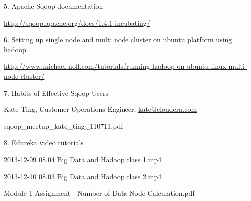 \documentclass[a4paper,12pt,oneside]{sphinxmanual}
\begin{document}
\begin{DUlineblock}{0em}
\item[] 5. Apache Sqoop documentation
\item[]
\begin{DUlineblock}{\DUlineblockindent}
\item[] \href{http://sqoop.apache.org/docs/1.4.1-incubating/}{http://sqoop.apache.org/docs/1.4.1-incubating/}
\end{DUlineblock}
\end{DUlineblock}

\begin{DUlineblock}{0em}
\item[] 6. Setting up single node and multi node cluster on ubuntu platform using hadoop
\item[]
\begin{DUlineblock}{\DUlineblockindent}
\item[] \href{http://www.michael-noll.com/tutorials/running-hadoop-on-ubuntu-linux-multi-node-cluster/}{http://www.michael-noll.com/tutorials/running-hadoop-on-ubuntu-linux-multi-node-cluster/}
\end{DUlineblock}
\end{DUlineblock}

\begin{DUlineblock}{0em}
\item[] 7. Habits of Effective Sqoop Users
\item[]
\begin{DUlineblock}{\DUlineblockindent}
\item[] Kate Ting, Customer Operations Engineer, \href{mailto:kate@cloudera.com}{kate@cloudera.com}
\item[] sqoop\_meetup\_kate\_ting\_110711.pdf
\end{DUlineblock}
\end{DUlineblock}

\begin{DUlineblock}{0em}
\item[] 8. Edureka video tutorials
\item[]
\begin{DUlineblock}{\DUlineblockindent}
\item[] 2013-12-09 08.04 Big Data and Hadoop class 1.mp4
\item[] 2013-12-10 08.03 Big Data and Hadoop class 2.mp4
\item[] Module-1 Assignment - Number of Data Node Calculation.pdf
\end{DUlineblock}
\end{DUlineblock}
\end{document}

